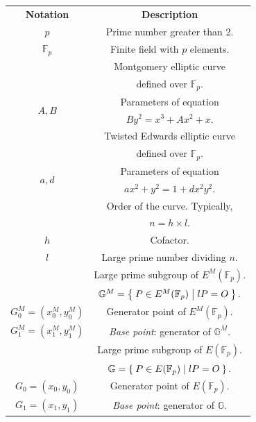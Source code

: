 \documentclass{article}
\newcommand{\Fp}{\ensuremath{\mathbb{F}_p}}
\newcommand{\G}{\ensuremath{\mathbb{G}}}
\theoremstyle{definition}
\theoremstyle{remark}
\begin{document}
\begin{spacing}{1.2}
\begin{multicols}{2}
\begin{center}
\begin{tabular}{|c|c|}
	\hline
		{\bf Notation} 	& {\bf Description} \\ 
	\Xhline{3\arrayrulewidth}	
		{$p$} 	& Prime number greater than 2.\\ 
	\hline
		{$\Fp$} & Finite field with $p$ elements.\\
	\Xhline{3\arrayrulewidth}	
		\multirow{2}{*}{$E_M$} 	& Montgomery elliptic curve\\ 
								& defined over $\Fp$.\\ 
	\hline
		\multirow{2}{*}{$A, B$} &Parameters of equation\\ 
								&$By^2 = x^3+Ax^2+x$.\\
	\Xhline{3\arrayrulewidth}			
		\multirow{2}{*}{$E$} 	& Twisted Edwards elliptic curve\\ 
								&defined over $\Fp$.\\ 
	\hline
		\multirow{2}{*}{$a, d$} &Parameters of equation\\ 
								&$ax^2 + y^2 = 1 +  d x^2 y^2$.\\ 
	\Xhline{3\arrayrulewidth}			
		\multirow{2}{*}{$n$} &Order of the curve. Typically, \\
							 &$n = h\times l$. \\ 
	\hline
		{$h$} & Cofactor.\\ 
	\hline
		{$l$} & Large prime number dividing $n$.\\
	\Xhline{3\arrayrulewidth}			
		\multirow{2}{*}{$\G^M$} 	&Large prime subgroup of $E^M(\Fp)$. \\
									& $\G^M = \Set{ P \in E^M(\Fp) | l P = O  }.$\\ 
	\hline
		{$G_0^M=(x_0^M, y_0^M)$} 	& Generator point of $E^M(\Fp)$.\\
	\hline
		{$G_1^M = (x_1^M, y_1^M)$} 	& {\it Base point}: generator of $\G^M$.\\ 
	\Xhline{3\arrayrulewidth}			
		\multirow{2}{*}{$\G$} 	&Large prime subgroup of  $E(\Fp)$. \\
								& $\G = \Set{ P \in E(\Fp) | l P = O  }.$\\ 
	\hline
		{$G_0=(x_0, y_0)$} 	& Generator point of $E(\Fp)$.\\ 
	\hline
		{$G_1 = (x_1, y_1)$} & {\it Base point}: generator of $\G$.\\ 
	\hline
\end{tabular}
\end{center}


\end{multicols}
\end{spacing}
\end{document}
